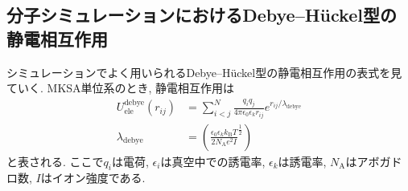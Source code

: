 \subsection{分子シミュレーションにおけるDebye--H\"{u}ckel型の静電相互作用}
シミュレーションでよく用いられるDebye--H\"{u}ckel型の静電相互作用の表式を見ていく.
MKSA単位系のとき, 静電相互作用は
\begin{align}
    U_{\mathrm{ele}}^{\mathrm{debye}} (r_{ij})
    &=
    \sum_{i<j}^{N}
    \frac{q_{i}q_{j}}{4\pi\epsilon_{0}\epsilon_{k}r_{ij}} e^{r_{ij}/\lambda_{\mathrm{debye}}}
    \\
    \lambda_{\mathrm{debye}}
    &=
    \left(
        \frac{\epsilon_{0}\epsilon_{k}k_{\mathrm{B}}T}{2N_{\mathrm{A}}e^{2}I}^{\frac{1}{2}}
    \right)
\end{align}
と表される.
ここで$q_{i}$は電荷, $\epsilon_{i}$は真空中での誘電率, $\epsilon_{k}$は誘電率, $N_{\mathrm{A}}$はアボガドロ数, $I$はイオン強度である.




% 
% 

